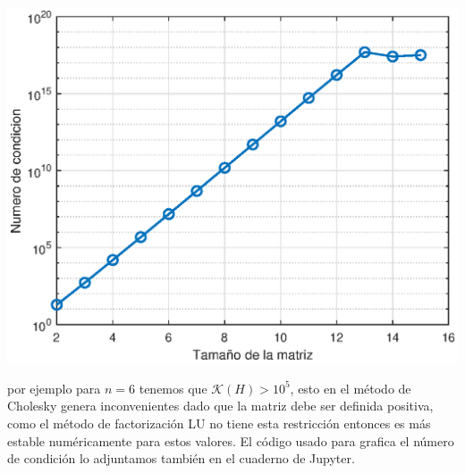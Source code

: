 \begin{solution}
\begin{center}
    \includegraphics[scale=0.7]{Graficas/condicion_tarea2.eps}
\end{center}

por ejemplo para $n=6$ tenemos que $\mathcal{K}(H)>10^5$, esto en el método de Cholesky genera inconvenientes dado que la matriz debe ser definida positiva, como el método de factorización LU no tiene esta restricción entonces es más estable numéricamente para estos valores. El código usado para grafica el número de condición lo adjuntamos también en el cuaderno de Jupyter.

\end{solution}